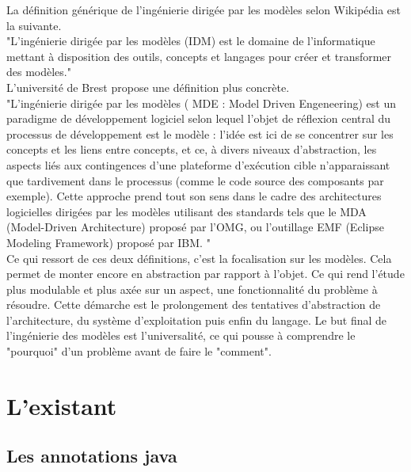 \documentclass[a4paper,11pt]{report}
\begin{document}
{{\normalsize{
La définition générique de l'ingénierie dirigée par les modèles selon Wikipédia est la suivante. \\

"L'ingénierie dirigée par les modèles (IDM) est le domaine de l'informatique mettant à disposition des outils, concepts et langages pour créer et transformer des modèles." \\

L'université de Brest propose une définition plus concrète. \\

"L'ingénierie dirigée par les modèles ( MDE : Model Driven Engeneering) est un paradigme de développement logiciel selon lequel l'objet de réflexion central du processus de développement est le modèle : l'idée est ici de se concentrer sur les concepts et les liens entre concepts, et ce, à divers niveaux d'abstraction, les aspects liés aux contingences d'une plateforme d'exécution cible n'apparaissant que tardivement dans le processus (comme le code source des composants par exemple). Cette approche prend tout son sens dans le cadre des architectures logicielles dirigées par les modèles utilisant des standards tels que le MDA (Model-Driven Architecture) proposé par l'OMG, ou l'outillage EMF (Eclipse Modeling Framework) proposé par IBM. " \\

Ce qui ressort de ces deux définitions, c'est la focalisation sur les modèles. Cela permet de monter encore en abstraction par rapport à l'objet. Ce qui rend l'étude plus modulable et plus axée sur un aspect, une fonctionnalité du problème à résoudre. Cette démarche est le prolongement des tentatives d'abstraction de l'architecture, du système d'exploitation puis enfin du langage. Le but final de l'ingénierie des modèles est l'universalité, ce qui pousse à comprendre le "pourquoi" d'un problème avant de faire le "comment".
}

\chapter{L'existant}

\section{Les annotations java}

}}
\end{document}
